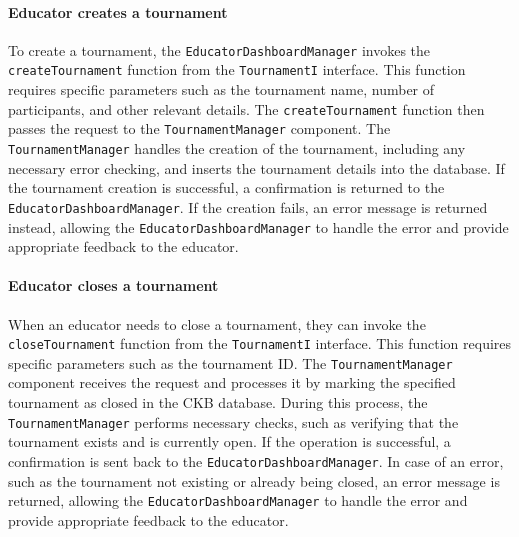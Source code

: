 \paragraph{Educator creates a tournament}
To create a tournament, the \verb|EducatorDashboardManager| invokes the \verb|createTournament| function from the \verb|TournamentI| interface. 
This function requires specific parameters such as the tournament name, number of participants, and other relevant details. The \verb|createTournament| function then passes the request to the \verb|TournamentManager| component. 
The \verb|TournamentManager| handles the creation of the tournament, including any necessary error checking, and inserts the tournament details into the database. If the tournament creation is successful, a confirmation is returned to the \verb|EducatorDashboardManager|. 
If the creation fails, an error message is returned instead, allowing the \verb|EducatorDashboardManager| to handle the error and provide appropriate feedback to the educator.

\paragraph{Educator closes a tournament}
When an educator needs to close a tournament, they can invoke the \verb|closeTournament| function from the \verb|TournamentI| interface. This function requires specific parameters such as the tournament ID. 
The \verb|TournamentManager| component receives the request and processes it by marking the specified tournament as closed in the CKB database. 
During this process, the \verb|TournamentManager| performs necessary checks, such as verifying that the tournament exists and is currently open. If the operation is successful, a confirmation is sent back to the \verb|EducatorDashboardManager|. 
In case of an error, such as the tournament not existing or already being closed, an error message is returned, allowing the \verb|EducatorDashboardManager| to handle the error and provide appropriate feedback to the educator.

